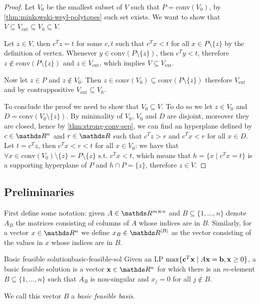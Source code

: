 \documentclass[12pt]{extarticle}
\renewcommand{\vec}[1]{\bvec{#1}}
\begin{document}
\begin{proof}
	Let $V_0$ be the smallest subset of $V$ such that $P = \mathrm{conv}(V_0)$,
	by \cref{thm:minkowski-weyl-polytopes} such set exists.
	We want to show that $V \subseteq V_\text{ext} \subseteq V_0 \subseteq V$.

	Let $z \in V$, then $c^T z = t$ for some $c, t$ such that $c^T x < t$
	for all $x \in P \setminus \{z\}$ by the definition of vertex.
	Whenever $y \in \mathrm{conv}(P\setminus \{z\})$, then $c^T y < t$, therefore
	$z \notin \mathrm{conv}(P\setminus \{z\})$ and $z \in V_\text{ext}$,
	which implies $V \subseteq V_\text{ext}$.

	Now let $z \in P$ and $z \notin V_0$.
	Then $z \in \mathrm{conv}(V_0) \subseteq \mathrm{conv}(P \setminus \{z\})$
	therefore $V_\text{ext}$ and by contrappositive $V_\text{ext} \subseteq V_0$.

	To conclude the proof we need to show that $V_0 \subseteq V$. To do so we let $z \in V_0$
	and $D = \mathrm{conv}(V_0 \setminus \{z\})$. By minimality of $V_0$, $V_0$ and $D$ are disjoint,
	moreover they are closed, hence by \cref{thm:strong-conv-sep}, we can find an hyperplane defined
	by $c \in \R^n$ and $r \in \R$ such that $c^T z > r$ and $c^T x < r$ for all $x \in D$.
	Let $t = c^T z$, then $c^T x < r < t$ for all $x \in V_0$:
	we have that $\forall x \in \mathrm{conv}(V_0) \setminus \{z\} =
		P \setminus \{z\} \text{ s.t. } c^T x < t$,	which means that $h = \{ x \mid c^T x = t \}$
	is a supporting hyperplane of $P$ and $h \cap P = \{z\}$, therefore $z \in V$.
\end{proof}

\subsection{Preliminaries}

First define some notation: given $A \in \R^{m \cross n}$ and $B \subseteq \{1, \dots, n\}$ denote
$A_B$ the matrices consisting of columns of $A$ whose indices are in $B$.
Similarly, for a vector $x \in \R^n$ we define $x_B \in \R^\abs{B}$ as the vector consisting
of the values in $x$ whose indices are in $B$.

\begin{definition}{Basic feasible solution}{basic-feasible-sol}
	Given an LP $\max \{ \vec c^T \vec x \mid A \vec x = \vec b, \vec x \geq 0\}$, a basic feasible solution
	is a vector $\vec x \in \R^n$ for which there is an $m$-element $B \subseteq \{1, \dots, n\}$
	such that $A_B$ is non-singular and $x_j = 0$ for all $j \notin B$.

	We call this vector $B$ a \emph{basic feasible basis}.
\end{definition}
\end{document}
